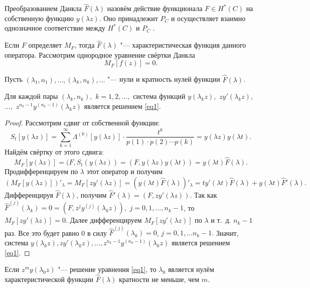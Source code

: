 Преобразованием Данкла $\hat F(\lambda)$ назовём действие функционала $F\in H^*(C)$ на собственную функцию $y(\lambda z)$. Оно принадлежит $P_C$ и осуществляет взаимно однозначное соответствие между $H^*(C)$ и $P_C$ \cite{zabirova1, zabirova2}.

Если $F$ определяет $M_F$, тогда $\hat F(\lambda)$ "--- характеристическая функция данного оператора. Рассмотрим однородное уравнение свёртки Данкла 
\begin{equation}
 \label{eq1}
M_F[f(z)]=0.
\end{equation}

Пусть $(\lambda_1,n_1),\dots,(\lambda_k,n_k),\dots $ "--- нули и кратность нулей функции $\hat F(\lambda)$. 

\smallskip

\begin{lemma}[2]Для каждой пары $(\lambda_k,n_k),$ $k=1, 2, \dots,$ система функций  $y(\lambda_kz),$ $ zy'(\lambda_kz),$ $ \dots,$ $ z^{n_k-1}y^{(n_k-1)}(\lambda_kz)$ является решением \eqref{eq1}{\rm .}
\end{lemma}

\begin{proof} Рассмотрим сдвиг от собственной функции: 
$$S_t[y(\lambda z)]=\sum\limits^{\infty}_{k=1} \Lambda^{(k)}[y(\lambda z)]\cdot 
\frac{t^k}{p(1)\cdot p(2)\cdots p(k)}=y(\lambda z)y(\lambda t).$$ 
Найдём свёртку от этого сдвига: 
$$M_F[y(\lambda z)]=(F,S_t(y(\lambda z))=(F,y(\lambda z)y(\lambda t))=y(\lambda t)\hat F(\lambda).$$ 
Продифференцируем по $\lambda$ этот оператор и получим 
$$(M_F[y(\lambda z)])'_{\lambda}=M_F[z y'(\lambda z)]=(y(\lambda t)\hat F(\lambda))'_{\lambda}=ty'(\lambda t)\hat F(\lambda)+y(\lambda t)\hat F'(\lambda).$$
Дифференцируя $\hat F(\lambda)$, получим $\hat F'(\lambda)=(F,zy'(\lambda z))$. 
Так как $\hat F^{(j)}(\lambda_k)=0=(F,z^j y^{(j)}(\lambda_k z)),$ $ j={0, 1, \dots, n_k-1}$, то $M_F[zy'(\lambda z)]=0$. Далее дифференцируем $M_F[zy'(\lambda z)]$ по $\lambda$ и т.~д. $n_k-1$ раз. Все это будет равно 0 в силу $\hat F^{(j)}(\lambda_k)=0$, $j={0, 1, \dots n_k-1}.$ Значит, система $y(\lambda_kz), zy'(\lambda_kz), \dots, z^{n_k-1}y^{(n_k-1)}(\lambda_kz)$ является решением \eqref{eq1}. \end{proof}

\smallskip

\begin{lemma}[3]Если $z^my(\lambda_0z)$ "--- решение уравнения \eqref{eq1}{\rm ,} то $\lambda_0$ является нулём характеристической функции $\hat F(\lambda)$ кратности не меньше{\rm ,} чем $m.$\end{lemma} 

